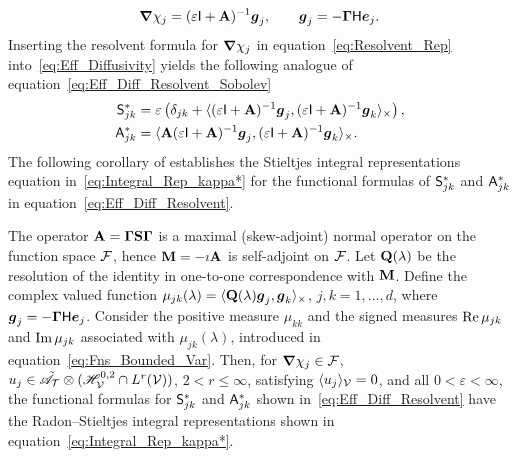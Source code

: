 \documentclass[amsa]{ipart}
\begin{document}
% 
\begin{align}\label{eq:Resolvent_Rep}
  \bnabla \chi_j=(\varepsilon\Ib+\Ab)^{-1}\vecg_j,
  \qquad
  \vecg_j=-\bGamma\Hm\vece_j.
\end{align}
%
Inserting the resolvent formula for
$\mbox{\boldmath${\nabla}$}\chi_j$ in equation~\eqref{eq:Resolvent_Rep}
into~\eqref{eq:Eff_Diffusivity} yields the following analogue 
of equation~\eqref{eq:Eff_Diff_Resolvent_Sobolev} 
%
\begin{align}\label{eq:Eff_Diff_Resolvent}
 \Sm^*_{jk}&=\varepsilon\left(\delta_{jk}+\langle(\varepsilon\Ib+\Ab)^{-1}\vecg_j,(\varepsilon\Ib+\Ab)^{-1}\vecg_k\rangle_\times\right),
 \\
 \Am^*_{jk}&=\langle\Ab(\varepsilon\Ib+\Ab)^{-1}\vecg_j,(\varepsilon\Ib+\Ab)^{-1}\vecg_k\rangle_\times.
 \notag
\end{align}
%
The following corollary of  establishes the  
Stieltjes integral representations equation
in~\eqref{eq:Integral_Rep_kappa*} for the functional formulas of
$\mathsf{S}^*_{jk}$ and $\mathsf{A}^*_{jk}$ in equation~\eqref{eq:Eff_Diff_Resolvent}.  
%
\begin{corollary}\label{cor:Integral_Reps}
%  
  The operator $\mathbf{A}=\mbox{\boldmath${\Gamma}$}\mathbf{S}\mbox{\boldmath${\Gamma}$}$ is a maximal (skew-adjoint)
  normal operator on the function space $\mathcal{F}$, hence $\mathbf{M}=-\imath\mathbf{A}$ is
  self-adjoint on $\mathcal{F}$. Let $\mathbf{Q}(\lambda)$ be the resolution of the
  identity in one-to-one correspondence with $\mathbf{M}$. Define the complex
  valued function $\mu_{jk}(\lambda)=\langle\mathbf{Q}(\lambda)\boldsymbol{g}_j,\boldsymbol{g}_k\rangle_\times$, $j,k=1,\ldots,d$,
  where $ \boldsymbol{g}_j=-\mbox{\boldmath${\Gamma}$}\mathsf{H}\boldsymbol{e}_j$. Consider the positive measure
  $\mu_{kk}$ and the 
  signed measures $\mbox{Re}\,\mu_{jk}$ and $\mbox{Im}\,\mu_{jk}$ associated with
  $\mu_{jk}(\lambda)$, introduced in
  equation~\eqref{eq:Fns_Bounded_Var}. Then, for $\mbox{\boldmath${\nabla}$}\chi_j\in\mathcal{F}$, 
  $u_j\in\tilde{\mathscr{A}}_{\mathcal{T}}\otimes (\mathscr{H}^{0,2}_{\mathcal{V}}\cap L^r(\mathcal{V}))$, $2<r\leq\infty$, satisfying
  $\langle u_j\rangle_{\mathcal{V}}=0$, and all $0<\varepsilon<\infty$, the functional formulas for
  $\mathsf{S}^*_{jk}$ and $\mathsf{A}^*_{jk}$ shown in~\eqref{eq:Eff_Diff_Resolvent}
  have the Radon--Stieltjes integral representations shown in
  equation~\eqref{eq:Integral_Rep_kappa*}.     
% 
\end{corollary}
%
\end{document}
